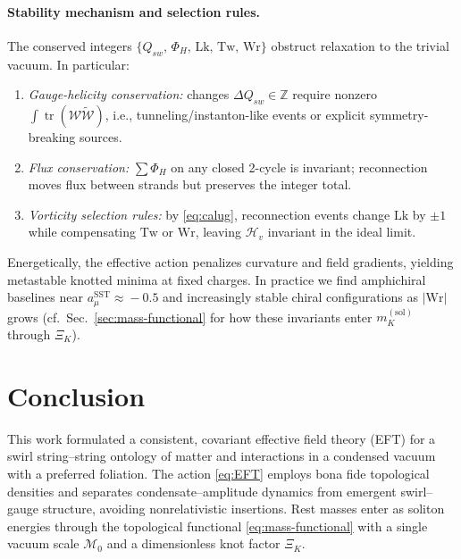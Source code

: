 \documentclass[11pt, preprint,titlepage]{revtex4-2}
\begin{document}
	\paragraph{Stability mechanism and selection rules.}
	The conserved integers \(\{Q_{\!sw},\,\Phi_H,\,\mathrm{Lk},\,\mathrm{Tw},\,\mathrm{Wr}\}\) obstruct relaxation to the trivial vacuum. In particular:
	\begin{enumerate}
		\item \textit{Gauge-helicity conservation:} changes \(\Delta Q_{\!sw}\in\mathbb{Z}\) require nonzero \(\int \mathop{\mathrm{tr}}(\mathcal{W}\tilde{\mathcal{W}})\), i.e., tunneling/instanton-like events or explicit symmetry-breaking sources.
		\item \textit{Flux conservation:} \(\sum \Phi_H\) on any closed 2-cycle is invariant; reconnection moves flux between strands but preserves the integer total.
		\item \textit{Vorticity selection rules:} by \eqref{eq:calug}, reconnection events change \(\mathrm{Lk}\) by \(\pm1\) while compensating \(\mathrm{Tw}\) or \(\mathrm{Wr}\), leaving \(\mathcal{H}_{\!v}\) invariant in the ideal limit.
	\end{enumerate}
	Energetically, the effective action penalizes curvature and field gradients, yielding metastable knotted minima at fixed charges. In practice we find amphichiral baselines near \(a_\mu^{\mathrm{SST}}\!\approx\!-0.5\) and increasingly stable chiral configurations as \(|\mathrm{Wr}|\) grows (cf.\ Sec.~\ref{sec:mass-functional} for how these invariants enter \(m_K^{(\mathrm{sol})}\) through \(\Xi_K\)).


    \section{Conclusion}

    This work formulated a consistent, covariant effective field theory (EFT) for a swirl string–string ontology of matter and interactions in a condensed vacuum with a preferred foliation. The action \eqref{eq:EFT} employs bona fide topological densities and separates condensate–amplitude dynamics from emergent swirl–gauge structure, avoiding nonrelativistic insertions. Rest masses enter as soliton energies through the topological functional \eqref{eq:mass-functional} with a single vacuum scale \(\mathcal{M}_0\) and a dimensionless knot factor \(\Xi_K\).
\end{document}
